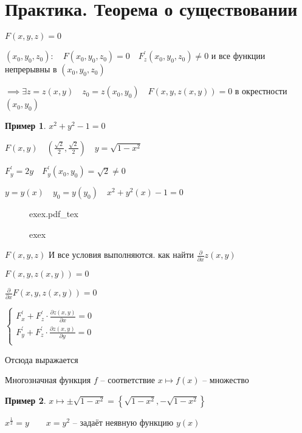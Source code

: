 \documentclass{book}
\newcommand{\p}[1]{#1^{\prime}}
\theoremstyle{definition}
\newtheorem*{example}{Пример}
\newcommand{\incfig}[1]{%
    \def\svgwidth{\columnwidth}
    {#1.pdf_tex}
}
\begin{document}
        \section{Практика. Теорема о существовании}

        \begin{theorem}
            $F(x, y, z) = 0$

            $(x_0, y_0, z_0):\quad F\left( x_0, y_0, z_0 \right) = 0\quad \p F_z(x_0, y_0, z_0) \neq 0$ и все функции непрерывны в $(x_0, y_0, z_0)$

            $\implies \exists z = z(x, y)\quad z_0 = z(x_0, y_0)\quad F(x, y, z(x, y)) = 0$ в окрестности $(x_0, y_0)$
        \end{theorem}

        \begin{example}
            $x^2 + y^2 - 1 = 0$

            $F(x, y)\quad \left( \frac{\sqrt{2} }{2}, \frac{\sqrt{2} }{2} \right) \quad y = \sqrt{1-x^2} $

            $\p F_y = 2y\quad \p F_y(x_0, y_0) = \sqrt{2}\neq 0 $ 

            $y = y(x)\quad y_0 = y(y_0)\quad x^2+y^2(x)-1=0$

        \end{example}
\begin{figure}[!ht]
    \centering
    \incfig{exex}
    \caption{exex}
    \label{fig:exex}
\end{figure}

        $F(x, y, z)$ И все условия выполняются. как найти  $\frac{\partial}{\partial x}z(x, y)$
        
        $F(x, y, z(x, y)) = 0$

        $\frac{\partial}{\partial x}F(x, y, z(x, y)) = 0$

        $\begin{cases}
            \p F_x + \p F_z\cdot \frac{\partial z(x, y)}{\partial x} = 0\\
            \p F_y + \p F_z\cdot \frac{\partial z(x, y)}{\partial y} = 0\\
        \end{cases}$ 

        Отсюда выражается

        \begin{definition}
            Многозначная функция $f$ -- соответствие  $x \mapsto f(x)$ -- множество
        \end{definition}
        \begin{example}
            $x\mapsto \pm \sqrt{1-x^2} = \left\{ \sqrt{1-x^2} , -\sqrt{1-x^2}  \right\}  $ 

            $x^{\frac{1}{2}} = y\qquad x = y^2$ -- задаёт неявную функцию $y(x)$
        \end{example}
\end{document}
